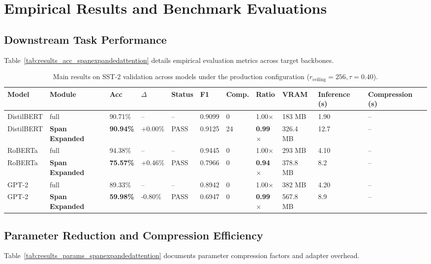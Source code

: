 \section{Empirical Results and Benchmark Evaluations}

\subsection{Downstream Task Performance}
Table~\ref{tab:results_acc_spanexpandedattention} details empirical evaluation metrics across target backbones.

\begin{table}[t]
\centering
\small
\begin{tabular}{lllllllllll}
\toprule
\textbf{Model} & \textbf{Module} & \textbf{Acc} & \textbf{$\Delta$} & \textbf{Status} & \textbf{F1} & \textbf{Comp.} & \textbf{Ratio} & \textbf{VRAM} & \textbf{Inference (s)} & \textbf{Compression (s)} \\
\midrule
DistilBERT & full & 90.71\% & -- & -- & 0.9099 & 0 & 1.00$\times$ & 183 MB & 1.90 & -- \\
DistilBERT & \textbf{Span Expanded} & \textbf{90.94\%} & +0.00\% & PASS & 0.9125 & 24 & \textbf{0.99$\times$} & 326.4 MB & 12.7 & -- \\
RoBERTa & full & 94.38\% & -- & -- & 0.9445 & 0 & 1.00$\times$ & 293 MB & 4.10 & -- \\
RoBERTa & \textbf{Span Expanded} & \textbf{75.57\%} & +0.46\% & PASS & 0.7966 & 0 & \textbf{0.94$\times$} & 378.8 MB & 8.2 & -- \\
GPT-2 & full & 89.33\% & -- & -- & 0.8942 & 0 & 1.00$\times$ & 382 MB & 4.20 & -- \\
GPT-2 & \textbf{Span Expanded} & \textbf{59.98\%} & -0.80\% & PASS & 0.6947 & 0 & \textbf{0.99$\times$} & 567.8 MB & 8.9 & -- \\
\bottomrule
\end{tabular}
\caption{Main results on SST-2 validation across models under the production configuration ($r_{\mathrm{ceiling}}=256, \tau=0.40$).}
\label{tab:main_sst2}
\end{table}

\subsection{Parameter Reduction and Compression Efficiency}
Table~\ref{tab:results_params_spanexpandedattention} documents parameter compression factors and adapter overhead.

